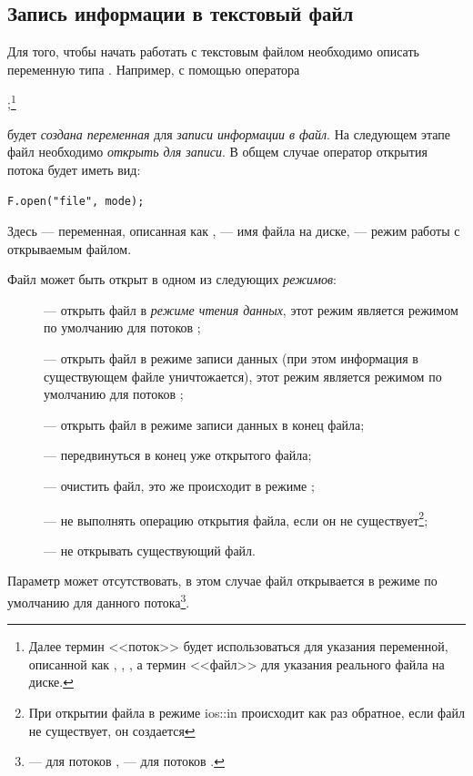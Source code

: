 \subsection[Запись информации в текстовый файл]{Запись информации в текстовый файл}
Для того, чтобы начать работать с текстовым файлом необходимо описать переменную типа .
Например, с помощью оператора

;\footnote{Далее термин <<поток>> будет использоваться для указания переменной,
описанной как , , , а термин <<файл>> для указания реального файла на диске.}

будет \emph{создана переменная}  для \emph{записи
информации в файл}. На следующем этапе файл необходимо
\emph{открыть для записи}. В общем случае оператор открытия потока
будет иметь вид:

\lstinline!F.open("file", mode);!

Здесь  --- переменная, описанная как ,  --- имя файла
на диске,  --- режим работы с открываемым файлом. 

Файл может быть открыт в одном из следующих \emph{режимов}:
\begin{description}
\item[] --- открыть файл в \emph{режиме чтения данных}, этот режим является режимом по
умолчанию для потоков ;
\item[] --- открыть файл в режиме записи данных (при этом информация в существующем файле
уничтожается), этот режим является режимом по умолчанию для потоков ;
\item[] --- открыть файл в режиме записи данных в конец файла;
\item[] --- передвинуться в конец уже открытого файла;
\item[] --- очистить файл, это же происходит в режиме ;
\item[] --- не выполнять операцию открытия файла, если он не существует\footnote{При открытии
файла в режиме ios::in происходит как раз обратное, если файл не существует, он создается}; 
\item[] --- не открывать существующий файл.
\end{description}
Параметр  может отсутствовать, в этом случае файл открывается в режиме по умолчанию для данного
потока\footnote{ --- для потоков ,  --- для потоков .}.

